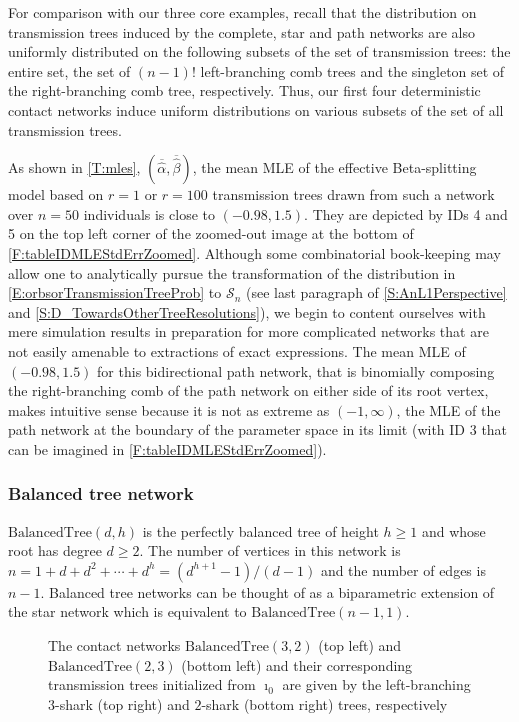 \documentclass[review]{elsarticle}
\numberwithin{equation}{section}
\let\orgautoref\autoref
\renewcommand{\autoref}
        {\def\equationautorefname{Eq.}%
         \def\figureautorefname{Fig.}%
         \def\subfigureautorefname{Fig.}%
         \def\sectionautorefname{Sect.}%
         \def\subsectionautorefname{Sect.}%
         \def\subsubsectionautorefname{Sect.}%
         \def\Itemautorefname{item}%
         \def\tableautorefname{Table}%
         \def\propositionautorefname{Prop.}%
         \def\corollaryautorefname{Corollary}%
         \def\theoremautorefname{Theorem}%
         \def\remarkautorefname{Remark}%
         \def\lemmaautorefname{Lemma}%
         \def\proofofautorefname{Proof}%
         \def\exampleautorefname{Example}%
         \orgautoref}
\begin{document}
For comparison with our three core examples, recall that the distribution on transmission trees induced by the complete, star and path networks are also uniformly distributed on the following subsets of the set of transmission trees: the entire set, the set of $(n-1)!$ left-branching comb trees and the singleton set of the right-branching comb tree, respectively.
Thus, our first four deterministic contact networks induce uniform distributions on various subsets of the set of all transmission trees.

As shown in \autoref{T:mles}, $(\overline{\widehat{\alpha}},\overline{\widehat{\beta}})$, the mean MLE of the effective Beta-splitting model based on $r=1$ or $r=100$ transmission trees drawn from such a network over $n=50$ individuals is close to $(-0.98,1.5)$.  
They are depicted by IDs 4 and 5 on the top left corner of the zoomed-out image at the bottom of \autoref{F:tableIDMLEStdErrZoomed}.  
Although some combinatorial book-keeping may allow one to analytically pursue the transformation of the distribution in \autoref{E:orbsorTransmissionTreeProb} to $\mathcal{S}_n$ (see last paragraph of \autoref{S:AnL1Perspective} and \autoref{S:D_TowardsOtherTreeResolutions}), we begin to content ourselves with mere simulation results in preparation for more complicated networks that are not easily amenable to extractions of exact expressions.  
The mean MLE of $(-0.98,1.5)$ for this bidirectional path network, that is binomially composing the right-branching comb of the path network on either side of its root vertex, makes intuitive sense because it is not as extreme as $(-1,\infty)$, the MLE of the path network at the boundary of the parameter space in its limit (with ID 3 that can be imagined in \autoref{F:tableIDMLEStdErrZoomed}).  

\subsubsection{Balanced tree network}

$\mathrm{BalancedTree}(d,h)$ is the perfectly balanced tree of height $h \geq 1$ and whose root has degree $d \geq 2$.  
The number of vertices in this network is $n = 1 + d + d^2 + \cdots + d^h = (d^{h+1} - 1)/(d - 1)$ and the number of edges is $n-1$.  
Balanced tree networks can be thought of as a biparametric extension of the star network which is equivalent to $\mathrm{BalancedTree}(n-1,1)$.  

\begin{figure}[htbp]
\begin{center}
{\scalebox{0.85}{

}}
\end{center}
\caption{The contact networks $\mathrm{BalancedTree}(3,2)$ (top left) and $\mathrm{BalancedTree}(2,3)$ (bottom left) and their corresponding transmission trees initialized from $\imath_0$ are given by the left-branching $3$-shark (top right) and $2$-shark (bottom right) trees, respectively\label{F:leftSharks}}
\end{figure}
\end{document}
